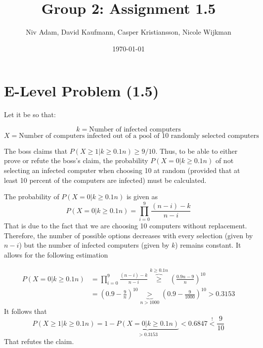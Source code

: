\documentclass{article}
\title{Group 2: Assignment 1.5}
\author{Niv Adam, David Kaufmann, Casper Kristiansson, Nicole Wijkman}
\date{\today}
\begin{document}
\maketitle

\section{E-Level Problem (1.5)}
Let it be so that:

$$k=\text{Number of infected computers}$$
$$X=\text{Number of computers infected out of a pool of 10 randomly selected computers}$$

\noindent The boss claims that $P(X \geq 1 | k \geq 0.1n) \geq 9/10$. Thus, to be able to either prove or refute the boss's claim, the probability $P(X = 0| k \geq 0.1n)$ of not selecting an infected computer when choosing 10 at random (provided that at least 10 percent of the computers are infected) must be calculated.

\noindent The probability of $P(X=0|k\geq 0.1n)$ is given as
$$P(X=0|k\geq 0.1n)=\prod\limits_{i=0}^{9} \frac{(n-i)-k}{n-i}$$
That is due to the fact that we are choosing 10 computers without replacement. Therefore, the number of possible options decreases with every selection (given by $n-i$) but the number of infected computers (given by $k$) remains constant. It allows for the following estimation

\begin{equation*}
    \begin{split}
    P(X=0|k\geq 0.1n)&=\prod\limits_{i=0}^{9} \frac{(n-i)-k}{n-i}\overbrace{\geq}^{k \geq 0.1n}\left( \frac{0.9n - 9}{n}\right) ^{10}\\ &=\left( 0.9- \frac{9}{n}\right)^{10}\underbrace{>}_{n>1000}\left( 0.9 - \frac{9}{1000}\right)^{10}>0.3153
    \end{split}
\end{equation*}
It follows that
$$P(X\geq 1|k\geq 0.1n)=1-\underbrace{P(X=0|k\geq 0.1n)}_{> 0.3153}<  0.6847 \overset{!}{<}\frac{9}{10}$$
That refutes the claim.
% 
% 
\end{document}
